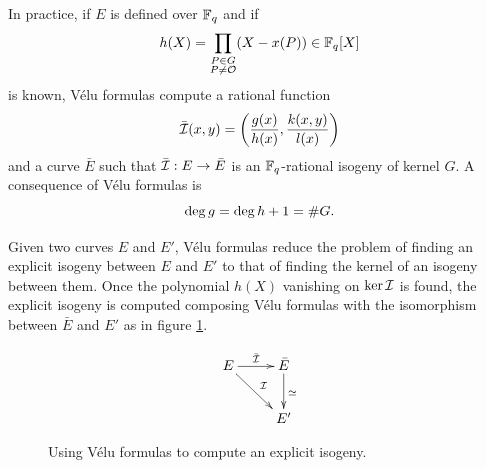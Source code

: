 In practice, if $E$ is defined over $\mathbb{F}_q$ and if
\[h(X) = \prod_{\substack{P\in G\\P\ne\mathcal{O}}}(X - x(P)) \in \mathbb{F}_q[X]\]
is known, Vélu formulas compute a rational function
\begin{equation}
  \label{eq:isog}
  \bar{\mathcal{I}}(x,y) = \left(\frac{g(x)}{h(x)}, \frac{k(x,y)}{l(x)}\right)  
\end{equation}
and a curve $\bar{E}$ such that $\bar{\mathcal{I}} : E\rightarrow\bar{E}$ is an
$\mathbb{F}_q$-rational isogeny of kernel $G$. A consequence of Vélu formulas
is
\begin{equation}
  \label{eq:velu-deg}
  \deg g = \deg h + 1 = \# G
  \text{.}
\end{equation}

Given two curves $E$ and $E'$, Vélu formulas reduce the problem of
finding an explicit isogeny between $E$ and $E'$ to that of finding
the kernel of an isogeny between them. Once the polynomial $h(X)$
vanishing on $\ker\mathcal{I}$ is found, the explicit isogeny is computed
composing Vélu formulas with the isomorphism between $\bar{E}$ and
$E'$ as in figure \ref{fig:velu}.

\begin{figure}
  \centering
  \[\xymatrix{
    E \ar[r]^{\bar{\I}} \ar[rd]^\I & \bar{E} \ar[d]^{\simeq}\\
    & E'
  }\]
  \caption{Using Vélu formulas to compute an explicit isogeny.}
  \label{fig:velu}
\end{figure}





%
